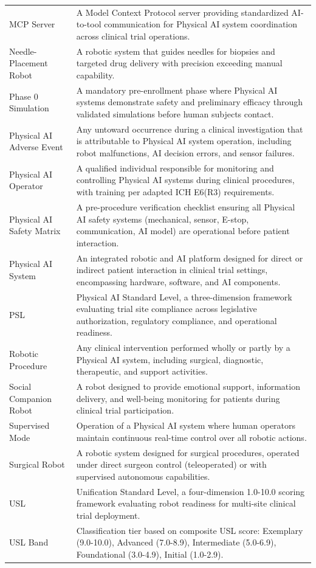 \begin{longtable}{p{4.5cm} p{11cm}}
MCP Server & A Model Context Protocol server providing standardized AI-to-tool communication for Physical AI system coordination across clinical trial operations. \\
Needle-Placement Robot & A robotic system that guides needles for biopsies and targeted drug delivery with precision exceeding manual capability. \\
Phase 0 Simulation & A mandatory pre-enrollment phase where Physical AI systems demonstrate safety and preliminary efficacy through validated simulations before human subjects contact. \\
Physical AI Adverse Event & Any untoward occurrence during a clinical investigation that is attributable to Physical AI system operation, including robot malfunctions, AI decision errors, and sensor failures. \\
Physical AI Operator & A qualified individual responsible for monitoring and controlling Physical AI systems during clinical procedures, with training per adapted ICH E6(R3) requirements. \\
Physical AI Safety Matrix & A pre-procedure verification checklist ensuring all Physical AI safety systems (mechanical, sensor, E-stop, communication, AI model) are operational before patient interaction. \\
Physical AI System & An integrated robotic and AI platform designed for direct or indirect patient interaction in clinical trial settings, encompassing hardware, software, and AI components. \\
PSL & Physical AI Standard Level, a three-dimension framework evaluating trial site compliance across legislative authorization, regulatory compliance, and operational readiness. \\
Robotic Procedure & Any clinical intervention performed wholly or partly by a Physical AI system, including surgical, diagnostic, therapeutic, and support activities. \\
Social Companion Robot & A robot designed to provide emotional support, information delivery, and well-being monitoring for patients during clinical trial participation. \\
Supervised Mode & Operation of a Physical AI system where human operators maintain continuous real-time control over all robotic actions. \\
Surgical Robot & A robotic system designed for surgical procedures, operated under direct surgeon control (teleoperated) or with supervised autonomous capabilities. \\
USL & Unification Standard Level, a four-dimension 1.0-10.0 scoring framework evaluating robot readiness for multi-site clinical trial deployment. \\
USL Band & Classification tier based on composite USL score: Exemplary (9.0-10.0), Advanced (7.0-8.9), Intermediate (5.0-6.9), Foundational (3.0-4.9), Initial (1.0-2.9). \\
\end{longtable}

